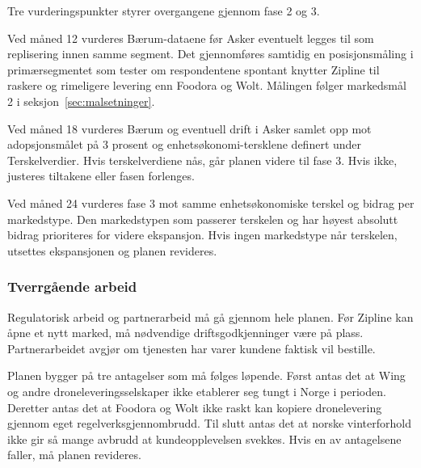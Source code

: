 Tre vurderingspunkter styrer overgangene gjennom fase 2 og 3.

Ved måned 12 vurderes Bærum-dataene før Asker eventuelt legges til som
replisering innen samme segment. Det gjennomføres samtidig en
posisjonsmåling i primærsegmentet som tester om respondentene spontant
knytter Zipline til raskere og rimeligere levering enn Foodora og Wolt.
Målingen følger markedsmål 2 i seksjon~\ref{sec:malsetninger}.

Ved måned 18 vurderes Bærum og eventuell drift i Asker samlet opp mot
adopsjonsmålet på 3 prosent og enhetsøkonomi-tersklene definert under
Terskelverdier. Hvis terskelverdiene nås, går planen videre til fase 3.
Hvis ikke, justeres tiltakene eller fasen forlenges.

Ved måned 24 vurderes fase 3 mot samme enhetsøkonomiske terskel og
bidrag per markedstype. Den markedstypen som passerer terskelen og har
høyest absolutt bidrag prioriteres for videre ekspansjon. Hvis ingen
markedstype når terskelen, utsettes ekspansjonen og planen revideres.

\subsubsection{Tverrgående arbeid}

Regulatorisk arbeid og partnerarbeid må gå gjennom hele planen. Før Zipline
kan åpne et nytt marked, må nødvendige driftsgodkjenninger være på plass.
Partnerarbeidet avgjør om tjenesten har varer kundene faktisk vil bestille.

Planen bygger på tre antagelser som må følges løpende. Først antas det at
Wing og andre droneleveringsselskaper ikke etablerer seg
tungt i Norge i perioden. Deretter antas det at Foodora og Wolt ikke raskt kan
kopiere dronelevering gjennom eget regelverksgjennombrudd. Til slutt antas det
at norske vinterforhold ikke gir så mange avbrudd at kundeopplevelsen svekkes.
Hvis en av antagelsene faller, må planen revideres.
